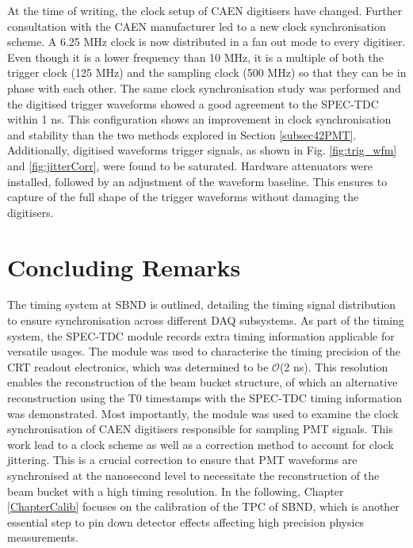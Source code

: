 At the time of writing, the clock setup of CAEN digitisers have changed.
Further consultation with the CAEN manufacturer led to a new clock synchronisation scheme.
A 6.25 MHz clock is now distributed in a fan out mode to every digitiser.
Even though it is a lower frequency than 10 MHz, it is a multiple of both the trigger clock (125 MHz) and the sampling clock (500 MHz) so that they can be in phase with each other.
The same clock synchronisation study was performed and the digitised trigger waveforms showed a good agreement to the SPEC-TDC within 1 ns.
This configuration shows an improvement in clock synchronisation and stability than the two methods explored in Section \ref{subsec42PMT}.    
Additionally, digitised waveforms trigger signals, as shown in Fig. \ref{fig:trig_wfm} and \ref{fig:jitterCorr}, were found to be saturated. 
Hardware attenuators were installed, followed by an adjustment of the waveform baseline.
This ensures to capture of the full shape of the trigger waveforms without damaging the digitisers.

\section{Concluding Remarks}
\label{sec5Remarks}

The timing system at SBND is outlined, detailing the timing signal distribution to ensure synchronisation across different DAQ subsystems. 
As part of the timing system, the SPEC-TDC module records extra timing information applicable for versatile usages.
The module was used to characterise the timing precision of the CRT readout electronics, which was determined to be $\mathcal{O}$(2 ns).
This resolution enables the reconstruction of the beam bucket structure, of which an alternative reconstruction using the T0 timestamps with the SPEC-TDC timing information was demonstrated.
Most importantly, the module was used to examine the clock synchronisation of CAEN digitisers responsible for sampling PMT signals.
This work lead to a clock scheme as well as a correction method to account for clock jittering.
This is a crucial correction to ensure that PMT waveforms are synchronised at the nanosecond level to necessitate the reconstruction of the beam bucket with a high timing resolution.
In the following, Chapter \ref{ChapterCalib} focuses on the calibration of the TPC of SBND, which is another essential step to pin down detector effects affecting high precision physics measurements.

